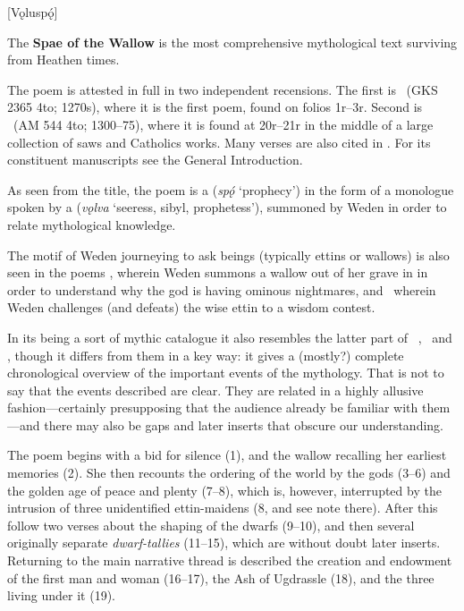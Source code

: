 [Vǫluspǫ́]


The \textbf{Spae of the Wallow} is the most comprehensive mythological text surviving from Heathen times.

The poem is attested in full in two independent recensions. The first is \Regius\ (GKS 2365 4to; 1270s), where it is the first poem, found on folios 1r–3r. Second is \Hauksbok\ (AM 544 4to; 1300–75), where it is found at 20r–21r in the middle of a large collection of saws and Catholics works. Many verses are also cited in \Gylfaginning. For its constituent manuscripts see the General Introduction. %

As seen from the title, the poem is a  (\emph{spǫ́} ‘prophecy’) in the form of a monologue spoken by a  (\emph{vǫlva} ‘seeress, sibyl, prophetess’), summoned by Weden in order to relate mythological knowledge.

The motif of Weden journeying to ask beings (typically ettins or wallows) is also seen in the poems \Baldrsdraumar, wherein Weden summons a wallow out of her grave in  in order to understand why the god  is having ominous nightmares, and \Vafthrudnismal\, wherein Weden challenges (and defeats) the wise ettin  to a wisdom contest.

In its being a sort of mythic catalogue it also resembles the latter part of \Havamal\, \Grimnismal, \Sigrdrifumal\ and \Allvismal, though it differs from them in a key way: it gives a (mostly?) complete chronological overview of the important events of the mythology. That is not to say that the events described are clear. They are related in a highly allusive fashion—certainly presupposing that the audience already be familiar with them—and there may also be gaps and later inserts that obscure our understanding.

\sectionline

The poem begins with a bid for silence (1), and the wallow recalling her earliest memories (2). She then recounts the ordering of the world by the gods (3–6) and the golden age of peace and plenty (7–8), which is, however, interrupted by the intrusion of three unidentified ettin-maidens (8, and see note there). After this follow two verses about the shaping of the dwarfs (9–10), and then several originally separate \emph{dwarf-tallies} (11–15), which are without doubt later inserts. Returning to the main narrative thread is described the creation and endowment of the first man and woman (16–17), the Ash of Ugdrassle (18), and the three  living under it (19).

